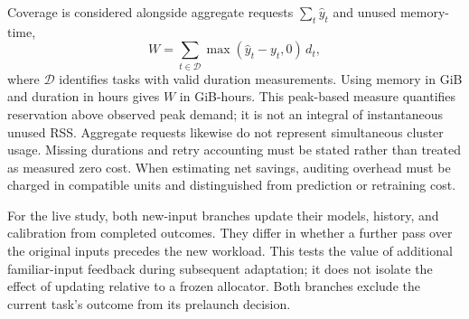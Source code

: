 Coverage is considered alongside aggregate requests $\sum_t\hat y_t$ and
unused memory-time,
\begin{equation}
W=\sum_{t\in\mathcal{D}}\max(\hat y_t-y_t,0)\,d_t,
\label{eq:unused_memory_time}
\end{equation}
where $\mathcal{D}$ identifies tasks with valid duration measurements.
Using memory in GiB and duration in hours gives $W$ in GiB-hours. This
peak-based measure quantifies reservation above observed peak demand;
it is not an integral of instantaneous unused RSS. Aggregate requests
likewise do not represent simultaneous cluster usage. Missing durations
and retry accounting must be stated rather than treated as measured zero
cost. When estimating net savings, auditing overhead must be charged in
compatible units and distinguished from prediction or retraining cost.

For the live study, both new-input branches update their models, history,
and calibration from completed outcomes. They differ in whether a further
pass over the original inputs precedes the new workload. This tests the
value of additional familiar-input feedback during subsequent adaptation;
it does not isolate the effect of updating relative to a frozen allocator.
Both branches exclude the current task's outcome from its prelaunch decision.
